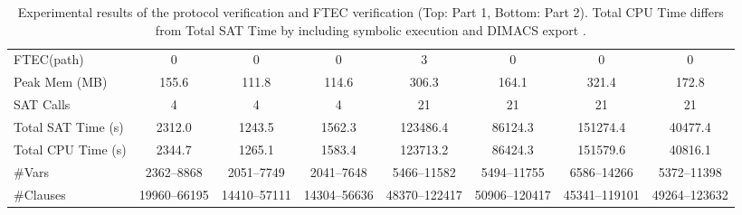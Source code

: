 \begin{table}[!htbp]
{\begin{tabular}{l ccccccc}
\midrule
FTEC(path) & 0 & 0 & 0 & 3 & 0 & 0 & 0 \\
Peak Mem (MB) & 155.6 & 111.8 & 114.6 & 306.3 & 164.1 & 321.4 & 172.8 \\
SAT Calls & 4 & 4 & 4 & 21 & 21 & 21 & 21 \\
Total SAT Time (s) & 2312.0 & 1243.5 & 1562.3 & 123486.4 & 86124.3 & 151274.4 & 40477.4 \\
Total CPU Time (s) & 2344.7 & 1265.1 & 1583.4 & 123713.2 & 86424.3 & 151579.6 & 40816.1 \\
\#Vars & 2362--8868 & 2051--7749 & 2041--7648 & 5466--11582 & 5494--11755 & 6586--14266 & 5372--11398 \\
\#Clauses & 19960--66195 & 14410--57111 & 14304--56636 & 48370--122417 & 50906--120417 & 45341--119101 & 49264--123632 \\
\bottomrule
\end{tabular}%
}
\caption{Experimental results of the protocol verification and FTEC verification (Top: Part 1, Bottom: Part 2). Total CPU Time differs from Total SAT Time by including symbolic execution and DIMACS export .}
\label{tab:combined-results}

\end{table}
